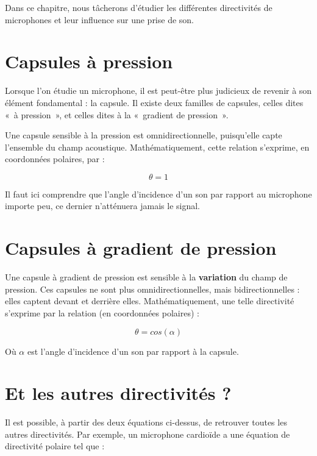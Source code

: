 \documentclass[
]{book}
\begin{document}
Dans ce chapitre, nous tâcherons d'étudier les différentes directivités de microphones et leur influence sur une prise de son.

\hypertarget{capsules-uxe0-pression}{%
\section{Capsules à pression}\label{capsules-uxe0-pression}}

Lorsque l'on étudie un microphone, il est peut-être plus judicieux de revenir à son élément fondamental : la capsule. Il existe deux familles de capsules, celles dites «~à pression~», et celles dites à la «~gradient de pression~».

Une capsule sensible à la pression est omnidirectionnelle, puisqu'elle capte l'ensemble du champ acoustique. Mathématiquement, cette relation s'exprime, en coordonnées polaires, par :

\[ \theta = 1 \]

Il faut ici comprendre que l'angle d'incidence d'un son par rapport au microphone importe peu, ce dernier n'atténuera jamais le signal.

\hypertarget{capsules-uxe0-gradient-de-pression}{%
\section{Capsules à gradient de pression}\label{capsules-uxe0-gradient-de-pression}}

Une capsule à gradient de pression est sensible à la \textbf{variation} du champ de pression. Ces capsules ne sont plus omnidirectionnelles, mais bidirectionnelles : elles captent devant et derrière elles. Mathématiquement, une telle directivité s'exprime par la relation (en coordonnées polaires) :

\[ \theta = cos(\alpha) \]

Où \(\alpha\) est l'angle d'incidence d'un son par rapport à la capsule.

\hypertarget{et-les-autres-directivituxe9s}{%
\section{Et les autres directivités ?}\label{et-les-autres-directivituxe9s}}

Il est possible, à partir des deux équations ci-dessus, de retrouver toutes les autres directivités. Par exemple, un microphone cardioïde a une équation de directivité polaire tel que :
\end{document}
